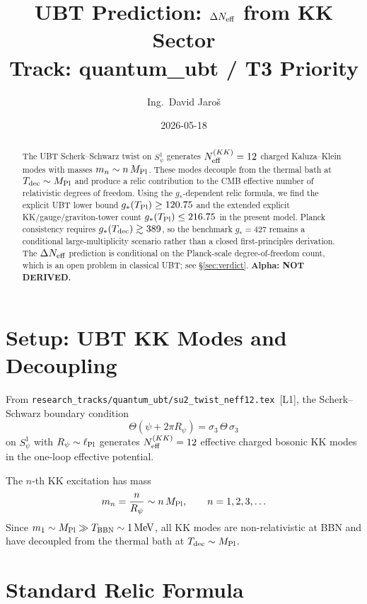 \documentclass[12pt,a4paper]{article}
\title{UBT Prediction: $\Delta N_{\rm eff}$ from KK Sector\\[4pt]
       \large Track: quantum\_ubt / T3 Priority}
\author{Ing.\ David Jaro\v{s}}
\date{2026-05-18}
\begin{document}
\maketitle

\begin{abstract}
The UBT Scherk--Schwarz twist on $S^1_\psi$ generates $N_{\rm eff}^{(KK)}=12$
charged Kaluza--Klein modes with masses $m_n \sim n\,M_{\rm Pl}$.
These modes decouple from the thermal bath at $T_{\rm dec} \sim M_{\rm Pl}$
and produce a relic contribution to the CMB effective number of relativistic
degrees of freedom. Using the $g_*$-dependent relic formula, we find the
explicit UBT lower bound $g_*(T_{\rm Pl})\ge 120.75$ and the extended explicit
KK/gauge/graviton-tower count $g_*(T_{\rm Pl})\le 216.75$ in the present model.
Planck consistency requires $g_*(T_{\rm dec})\gtrsim 389$, so the benchmark
$g_*=427$ remains a conditional large-multiplicity scenario rather than a
closed first-principles derivation.
The $\Delta N_{\rm eff}$ prediction is conditional on the
Planck-scale degree-of-freedom count, which is an open problem
in classical UBT; see §\ref{sec:verdict}.
\textbf{Alpha: NOT DERIVED.}
\end{abstract}

\tableofcontents

\section{Setup: UBT KK Modes and Decoupling}
\label{sec:setup}

From \texttt{research\_tracks/quantum\_ubt/su2\_twist\_neff12.tex}~[L1],
the Scherk--Schwarz boundary condition
\[
  \Theta(\psi + 2\pi R_\psi) = \sigma_3\,\Theta\,\sigma_3
\]
on $S^1_\psi$ with $R_\psi \sim \ell_{\rm Pl}$ generates $N_{\rm eff}^{(KK)}=12$
effective charged bosonic KK modes in the one-loop effective potential.

The $n$-th KK excitation has mass
\[
  m_n = \frac{n}{R_\psi} \sim n\,M_{\rm Pl},
  \qquad n = 1,2,3,\ldots
\]
Since $m_1 \sim M_{\rm Pl} \gg T_{\rm BBN} \sim 1\,\mathrm{MeV}$,
all KK modes are non-relativistic at BBN and have decoupled
from the thermal bath at $T_{\rm dec} \sim M_{\rm Pl}$.

\section{Standard Relic Formula}
\label{sec:formula}
\end{document}
